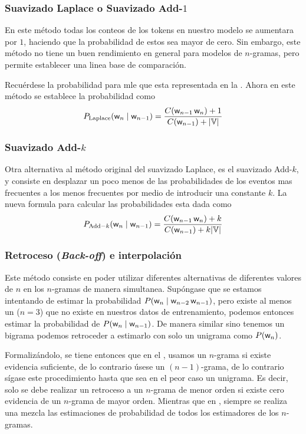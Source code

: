 \subsubsection{Suavizado Laplace o Suavizado Add-$1$}
En este método todas los conteos de los tokens en nuestro modelo se aumentara por $1$, haciendo que la probabilidad de estos sea mayor de cero. Sin embargo, este método no tiene un buen rendimiento en general para modelos de $n$-gramas, pero permite establecer una linea base de comparación.

Recuérdese la probabilidad para \gls{mle} que esta representada en la . Ahora en este método se establece la probabilidad como
\begin{equation} \label{eq:laplace-smoothing}
  P_{\mathrm{Laplace}}({\mathit{\mathsf{w}}}_n \mid {\mathit{\mathsf{w}}}_{n-1}) = \frac{C({\mathit{\mathsf{w}}}_{n-1} \, {\mathit{\mathsf{w}}}_n) +1}{C({\mathit{\mathsf{w}}}_{n-1}) + |{\mathbb{V}}|}
\end{equation}

\subsubsection{Suavizado Add-$k$}
Otra alternativa al método original del suavizado Laplace, es el suavizado Add-$k$, y consiste en desplazar un poco menos de las probabilidades de los eventos mas frecuentes a los menos frecuentes por medio de introducir una constante $k$. La nueva formula para calcular las probabilidades esta dada como
\begin{equation} \label{eq:add-k-smoothing}
  P_{\mathrm{Add-}k}({\mathit{\mathsf{w}}}_n \mid {\mathit{\mathsf{w}}}_{n-1}) = \frac{C({\mathit{\mathsf{w}}}_{n-1} \, {\mathit{\mathsf{w}}}_n) +k}{C({\mathit{\mathsf{w}}}_{n-1}) + k |{\mathbb{V}}|}
\end{equation}

\subsubsection{Retroceso (\textsl{Back-off}) e interpolación}
Este método consiste en poder utilizar diferentes alternativas de diferentes valores de $n$ en los $n$-gramas de manera simultanea. Supóngase que se estamos intentando de estimar la probabilidad $P({\mathit{\mathsf{w}}}_n \mid {\mathit{\mathsf{w}}}_{n-2} \, {\mathit{\mathsf{w}}}_{n-1})$, pero existe al menos un  ($n=3$) que no existe en nuestros datos de entrenamiento, podemos entonces estimar la probabilidad de $P({\mathit{\mathsf{w}}}_n \mid {\mathit{\mathsf{w}}}_{n-1})$. De manera similar sino tenemos un bigrama podemos retroceder a estimarlo con solo un unigrama como $P({\mathit{\mathsf{w}}}_n)$.

Formalizándolo, se tiene entonces que en el , usamos un $n$-grama si existe evidencia suficiente, de lo contrario úsese un $(n-1)$-grama, de lo contrario sígase este procedimiento hasta que sea en el peor caso un unigrama. Es decir, solo se debe realizar un retroceso a un $n$-grama de menor orden si existe cero evidencia de un $n$-grama de mayor orden. Mientras que en , siempre se realiza una mezcla las estimaciones de probabilidad de todos los estimadores de los $n$-gramas.

